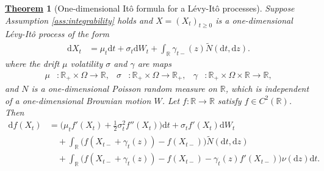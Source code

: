 \documentclass[12pt]{book}
\numberwithin{equation}{chapter}
\theoremstyle{plain}
\newtheorem{theorem}{\underline{Theorem}}
\numberwithin{theorem}{section}
\theoremstyle{definition}
\numberwithin{exercise}{chapter}
\newcommand{\<}{\langle}
\renewcommand{\>}{\rangle}
\renewcommand{\(}{\left(}
\renewcommand{\)}{\right)}
\renewcommand{\[}{\left[}
\renewcommand{\]}{\right]}
\newcommand\Rb{\mathds{R}}
\newcommand\Om{\Omega}
\newcommand\sig{\sigma}
\newcommand\gam{\gamma}
\newcommand\Nt{\widetilde{N}}
\newcommand\dd{\mathrm{d}}
\begin{document}
\begin{theorem}[One-dimensional It\^o formula for a L\'evy-It\^o processes]
\label{thm:ito.formula.levy}
Suppose Assumption \ref{ass:integrability} holds and $X = (X_t)_{t \geq 0}$ is a one-dimensional L\'evy-It\^o process of the form
\begin{align}
\dd X_t
	&=	\mu_t \dd t + \sig_t \dd W_t + \int_\Rb \gam_{t-}(z) \Nt( \dd t, \dd z) . \label{eq:dX.thm}
\end{align}
where the drift $\mu$ volatility $\sig$ and $\gam$ are maps
\begin{align}
\mu
	&: \Rb_+ \times \Om \to \Rb , &
\sig
	&: \Rb_+ \times \Om \to \Rb_+ , &
\gam
	&: \Rb_+ \times \Om \times \Rb \to \Rb ,
\end{align}
and $N$ is a one-dimensional Poisson random measure on $\Rb$, which is independent of a one-dimensional Brownian motion $W$.
Let $f : \Rb \to \Rb$ satisfy $f \in C^2(\Rb)$.  Then
\begin{align}
\dd f(X_t)
	&=	\Big( \mu_t  f'(X_t) + \tfrac{1}{2} \sig_t^2 f''(X_t)  \Big) \dd t 
			+ \sig_t f'(X_t) \dd W_t \\ &\quad
			+	\int_\Rb \Big( f\(X_{t-} + \gam_{t}(z) \) - f\(X_{t-}\) \Big) \Nt( \dd t, \dd z) \\ &\quad
			+	\int_\Rb \Big( f\(X_{t-} + \gam_{t}(z) \) - f\(X_{t-}\) - \gam_{t}(z) f'(X_{t-}) \Big) \nu(\dd z) \dd t . \label{eq:df}
\end{align}
\end{theorem}
\end{document}
